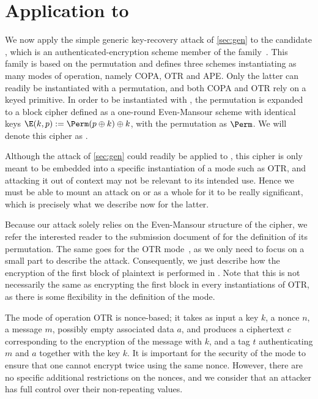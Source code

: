 \section{Application to \proestotr}
\label{sec:appli}

We now apply the simple generic key-recovery attack of \autoref{sec:gen} to the \caesar candidate \proestotr, which is an authenticated-encryption
scheme member of the \proest family~\cite{proest}. This family is based on the \proest permutation and defines
three schemes instantiating as many modes of operation, namely COPA, OTR and APE. Only
the latter can readily be instantiated with a permutation, and both COPA and OTR rely on a keyed primitive. In order
to be instantiated with \proest, the permutation is expanded to a block cipher
defined as a one-round Even-Mansour scheme with identical keys
$\E(k,p) := \Perm(p \oplus k) \oplus k$,
with the \proest permutation as $\Perm$. We will denote this cipher as \proestem.

Although the attack of \autoref{sec:gen} could readily be applied to \proestem, this cipher is only
meant to be embedded into a specific instantiation of a mode such as OTR, and attacking it out of context may not
be relevant to its intended use.
Hence we must
be able to mount an attack on \proestcopa or \proestotr as a whole for it to be really significant,
which is precisely what we describe now for the latter.

Because our attack solely relies on the Even-Mansour structure of the cipher, we refer the interested reader to the
submission document of \proest for the definition of its permutation.
The same goes for the OTR mode~\cite{M14}, as we only need to focus on a small part to describe the attack.
Consequently, we just describe how the encryption of the first block of plaintext is performed in \proestotr. Note that this is not necessarily the
same as encrypting the first block in every instantiations of OTR, as there is some flexibility in the definition of the mode.

\medskip

The mode of operation OTR is nonce-based; it takes as input a key $k$, a nonce $n$, a message $m$,
possibly empty associated data $a$, and produces a ciphertext $c$ corresponding
to the encryption of the message with $k$, and a tag $t$ authenticating $m$ and
$a$ together with the key $k$. It is important for the security of the mode to ensure
that one cannot encrypt twice using the same nonce. However, there are no
specific additional restrictions on the nonces, and we consider that an attacker
has full control over their non-repeating values.

